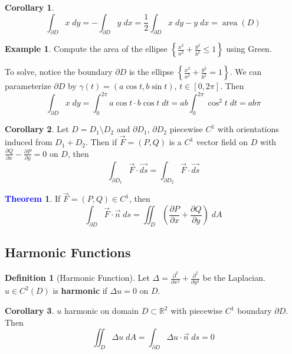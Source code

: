 \documentclass[11pt]{article}
\theoremstyle{definition}
\newtheorem{exmp}{Example}[section]
\theoremstyle{definition}
\newcommand{\R}[0]{\mathbb{R}}
\newtheorem{theorem}{\textcolor{blue}{Theorem}}
\newtheorem{corollary}{Corollary}
\theoremstyle{definition}
\newtheorem{definition}{\textcolor{OliveGreen}{Definition}}
\theoremstyle{remark}
\begin{document}
\begin{corollary}
    \[
        \int_{\partial D} x \; dy = - \int_{\partial D} y \; dx = \frac{1}{2}\int_{\partial D} x \; dy - y \; dx = \operatorname{area}(D)
    \] 
\end{corollary}

\begin{exmp}
    Compute the area of the ellipse $\left\{ \frac{x^2}{a^2} + \frac{y^2}{b^2} \leq 1 \right\} $ using Green.

    To solve, notice the boundary $\partial D$ is the ellipse $\left\{ \frac{x^2}{a^2} + \frac{y^2}{b^2} = 1 \right\}$. We can parameterize $\partial D$ by $\gamma(t) = (a \cos t, b \sin t)$, $t \in [0, 2\pi]$. Then
    \[
        \int_{\partial D} x \; dy = \int_{0}^{2\pi} a \cos t \cdot b \cos t \; dt = ab \int_0^{2\pi} \cos^2 t \; dt = ab \pi
    \]  
\end{exmp}

\begin{corollary}
    Let $D = D_1 \setminus D_2$ and $\partial D_1$, $\partial D_2$ piecewise $C^1$ with orientations
    induced from $D_1 + D_2$. Then if $\vec{F} = (P, Q)$ is a $C^1$ vector field on $D$ with 
    $\frac{\partial Q}{\partial x} - \frac{\partial P}{\partial y} = 0$ on $D$, then
    \[
        \int_{\partial D_1} \vec{F} \cdot \vec{ds} = \int_{\partial D_2} \vec{F} \cdot \vec{ds}
    \] 
\end{corollary}

\begin{theorem}
    If $\vec{F} = (P, Q) \in C^1$, then 
    \[
        \int_{\partial D} \vec{F} \cdot \vec{n} \; ds = \iint_D \left( \frac{\partial P}{\partial x} + \frac{\partial Q}{\partial y} \right) \; dA
    \]  
\end{theorem}

\subsection{Harmonic Functions}

\begin{definition}[Harmonic Function]
    Let $\Delta = \frac{\partial^2}{\partial x^2} + \frac{\partial^2}{\partial y^2}$ be the Laplacian. $u \in C^2(D)$ is 
    \textbf{harmonic} if $\Delta u = 0$ on $D$.  
\end{definition}

\begin{corollary}
    $u$ harmonic on domain $D \subset \R^2$ with piecewise $C^1$ boundary $\partial D$. Then  
    \[
        \iint_{D} \Delta u \; dA = \int_{\partial D} \Delta u \cdot \vec{n} \; ds = 0
    \]  
\end{corollary}
\end{document}
